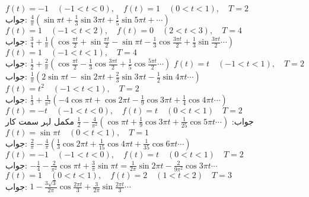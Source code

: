 \quad
$f(t)=-1\quad (-1<t<0), \quad f(t)=1\quad (0<t<1),\quad T=2$\\
جواب:\quad
$\tfrac{4}{\pi}(\sin \pi t+\tfrac{1}{3}\sin 3\pi t+\tfrac{1}{5}\sin 5\pi t+\cdots)$
\quad
$f(t)=1\quad (-1<t<2), \quad f(t)=0\quad (2<t<3),\quad T=4$\\
جواب:\quad
$\tfrac{3}{4}+\tfrac{1}{\pi}(\cos \tfrac{\pi t}{2}+\sin \tfrac{\pi t}{2}-\sin \pi t-\tfrac{1}{3}\cos \tfrac{3\pi t}{2}+\tfrac{1}{3}\sin \tfrac{3\pi t}{2}\cdots)$
\quad
$f(t)=1\quad (-1<t<1),\quad T=4$\\
جواب:\quad
$\tfrac{1}{2}+\tfrac{2}{\pi}(\cos \tfrac{\pi t}{2}-\tfrac{1}{3}\cos \tfrac{3\pi t}{2}+\tfrac{1}{5}\cos \tfrac{5\pi t}{2}\cdots)$
\quad
$f(t)=t\quad (-1<t<1),\quad T=2$\\
جواب:\quad
$\tfrac{1}{\pi}(2\sin \pi t-\sin 2\pi t+\tfrac{2}{3}\sin 3\pi t-\tfrac{1}{2}\sin 4\pi t\cdots)$
\quad
$f(t)=t^2\quad (-1<t<1),\quad T=2$\\
جواب:\quad
$\tfrac{1}{3}+\tfrac{1}{\pi^2}(-4\cos \pi t+\cos 2\pi t-\tfrac{1}{9}\cos 3\pi t+\tfrac{1}{4}\cos 4\pi t\cdots)$
\quad
$f(t)=-t\quad (-1<t<0),\quad f(t)=t\quad (0<t<1)\quad T=2$\\
جواب:\quad
$\tfrac{1}{2}-\tfrac{4}{\pi^2}(\cos \pi t+\tfrac{1}{9}\cos 3\pi t+\tfrac{1}{25}\cos 5\pi t\cdots)$
\quad مکمل لہر سمت کار\quad 
$f(t)=\sin \pi t\quad (0<t<1),\quad T=1$\\
جواب:\quad
$\tfrac{2}{\pi}-\tfrac{4}{\pi}(\tfrac{1}{3}\cos 2\pi t+\tfrac{1}{15}\cos 4\pi t+\tfrac{1}{35}\cos 6\pi t\cdots)$
\quad
$f(t)=-1\quad (-1<t<0),\quad f(t)=t\quad (0<t<1)\quad T=2$\\
جواب:\quad
$-\tfrac{1}{4}-\tfrac{2}{\pi^2}\cos \pi t+\tfrac{3}{\pi}\sin \pi t=\tfrac{1}{2\pi}\sin 2\pi t-\tfrac{2}{9\pi^2}\cos 3\pi t\cdots$
\quad
$f(t)=1\quad (0<t<1),\quad f(t)=2\quad (1<t<2)\quad T=3$\\
جواب:\quad
$1-\tfrac{3\sqrt{3}}{2\pi}\cos \tfrac{2\pi t}{3}+\tfrac{3}{2\pi}\sin \tfrac{2\pi t}{3}\cdots$
\quad

